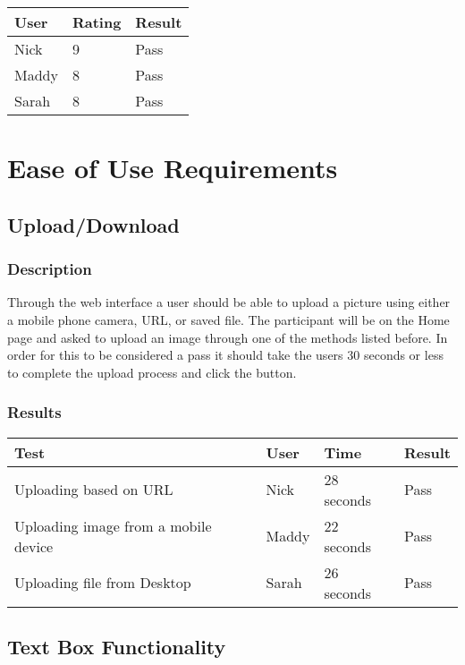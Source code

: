 \documentclass{scrreprt}
\begin{document}
 \centering
 \begin{tabular}{||p{2.5cm}|p{2.5cm}|p{2.5cm}||}
 \hline
 \bf User & \bf Rating & \bf Result\\
 \hline\hline
 Nick & 9 & Pass \\
 \hline
 Maddy & 8 & Pass\\ %
 \hline
 Sarah & 8 & Pass \\
 \hline
 \end{tabular}

\section{Ease of Use Requirements}

\subsection{Upload/Download}
\subsubsection{Description}
\begin{flushleft}
Through the web interface a user should be able to upload a picture using either a mobile phone camera, URL, or saved file. The participant will be on the Home page and asked to upload an image through one of the methods listed before. In order for this to be considered a pass it should take the users 30 seconds or less to complete the upload process and click the button. 
\subsubsection{Results}
\end{flushleft}

 \centering
 \begin{tabular}{||p{4.5cm}|p{2.5cm}|p{2.5cm}|p{2.5cm}||}
 \hline
 \bf Test & \bf User & \bf Time & \bf Result \\
 \hline\hline
    Uploading based on URL & Nick & 28 seconds & Pass\\
 \hline\hline
    Uploading image from a mobile device & Maddy & 22 seconds  & Pass\\
 \hline\hline
    Uploading file from Desktop &  Sarah & 26 seconds & Pass\\
 \hline
 \end{tabular}
 
\subsection{Text Box Functionality}
\end{document}
